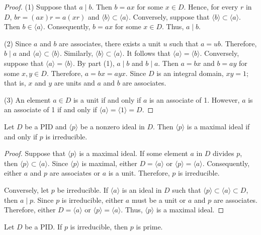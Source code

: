 \begin{proof}
(1)
Suppose that $a \mid b$. Then $b = ax$ for some $x \in D$. Hence, for
every $r$ in $D$, $br =(ax)r = a(xr)$ and $\langle b \rangle \subset
\langle a \rangle$. Conversely, suppose that $\langle b \rangle
\subset \langle a \rangle$. Then $b \in \langle a \rangle$.
Consequently, $b =a x$ for some $x \in D$.  Thus, $a \mid b$.
 

(2)
Since $a$ and $b$ are associates, there exists a unit $u$ such that 
$a = u b$.  Therefore, $b \mid a$ and $\langle a \rangle \subset 
\langle b \rangle$. Similarly, $\langle b \rangle \subset \langle a 
\rangle$. It follows that $\langle a \rangle = \langle b \rangle$.
Conversely, suppose that $\langle a \rangle = \langle b
\rangle$. By part (1), $a \mid b$ and $b \mid a$. Then $a = bx$ and $b
= ay$ for some $x, y \in D$. Therefore, $a = bx = ayx$. Since $D$ is
an integral domain, $x y =1$; that is, $x$ and $y$ are units and $a$
and $b$ are associates.   


(3)
An element $a \in D$ is a unit if and only if $a$ is an associate of
1. However, $a$ is an associate of 1 if and only if $\langle a \rangle
= \langle 1 \rangle = D$. 
\end{proof}


\begin{theorem}
Let $D$ be a PID and $\langle p \rangle$ be a nonzero ideal in $D$. 
Then $\langle p \rangle$ is a maximal ideal if and only if $p$ is
irreducible.
\end{theorem}


\begin{proof}
Suppose that $\langle p \rangle$ is a maximal ideal.  If some element
$a$ in $D$ divides $p$, then $\langle p \rangle \subset \langle a
\rangle$.  Since $\langle p \rangle$ is maximal, either $D = \langle
a \rangle$ or $\langle p \rangle = \langle a \rangle$.  Consequently,
either $a$ and $p$ are associates or $a$ is a unit.  Therefore, $p$
is irreducible.


Conversely, let $p$ be irreducible. If $\langle a \rangle$ is an
ideal in $D$ such that  $\langle p \rangle \subset \langle a \rangle
\subset D$, then $a \mid p$. Since $p$ is irreducible, either $a$ must
be a unit or $a$ and $p$ are associates. Therefore, either $D =
\langle a \rangle$ or $\langle p \rangle = \langle a \rangle$.  Thus,
$\langle p \rangle$ is a maximal ideal.
\end{proof}


\begin{corollary}
Let $D$ be a PID. If $p$ is irreducible, then $p$ is prime.
\end{corollary}


